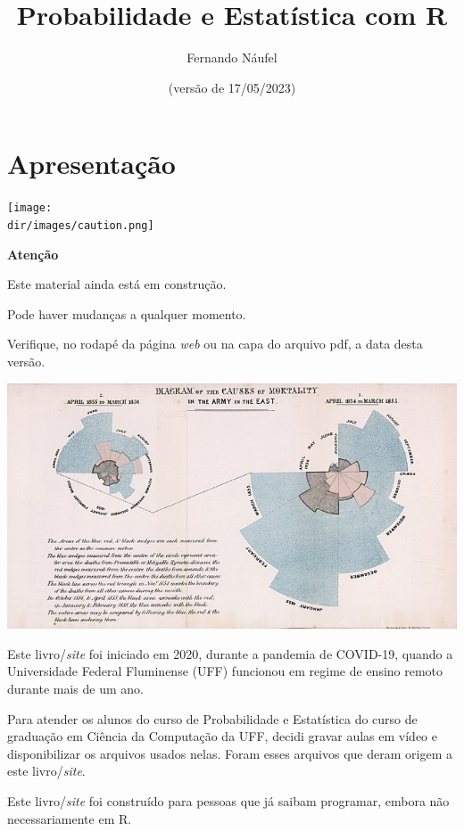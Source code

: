\documentclass[
  11pt]{report}
\title{Probabilidade e Estatística com R}
\author{Fernando Náufel}
\date{(versão de 17/05/2023)}
\newcommand{\dir}{/ssd/R/x86_64-pc-linux-gnu-library/4.3/fnaufelRmd/rmarkdown/resources}
\newenvironment{rmdcaution}
{
  \begin{mycaution}
    \texttt{[image: \\dir/images/caution.png]}
    \tcblower
  }
  {
  \end{mycaution}
}
\begin{document}
\maketitle

{
\setcounter{tocdepth}{1}
\tableofcontents
}
\hypertarget{apresentacao}{%
\chapter*{Apresentação}\label{apresentacao}}

\begin{rmdcaution}
\textbf{Atenção}

Este material ainda está em construção.

Pode haver mudanças a qualquer momento.

Verifique, no rodapé da página \emph{web} ou na capa do arquivo pdf, a data desta versão.

\end{rmdcaution}

\newpage

\includegraphics{images/640px-Nightingale-mortality.jpg}

\vspace{2cm}

Este livro/\emph{site} foi iniciado em 2020, durante a pandemia de COVID-19, quando a Universidade Federal Fluminense (UFF) funcionou em regime de ensino remoto durante mais de um ano.

Para atender os alunos do curso de Probabilidade e Estatística do curso de graduação em Ciência da Computação da UFF, decidi gravar aulas em vídeo e disponibilizar os arquivos usados nelas. Foram esses arquivos que deram origem a este livro/\emph{site}.

Este livro/\emph{site} foi construído para pessoas que já saibam programar, embora não necessariamente em R.
\end{document}
